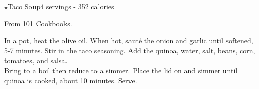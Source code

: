 \begin{recipe}{\texorpdfstring{$\star$}{str}Taco Soup}{4 servings - 352 calories}{}

\freeform From 101 Cookbooks.


In a pot, heat the olive oil. When hot, sauté the onion and garlic until softened, 5-7 minutes. Stir in the taco seasoning. Add the quinoa, water, salt, beans, corn, tomatoes, and salsa.\\

Bring to a boil then reduce to a simmer. Place the lid on and simmer until quinoa is cooked, about 10 minutes. Serve.

\end{recipe}